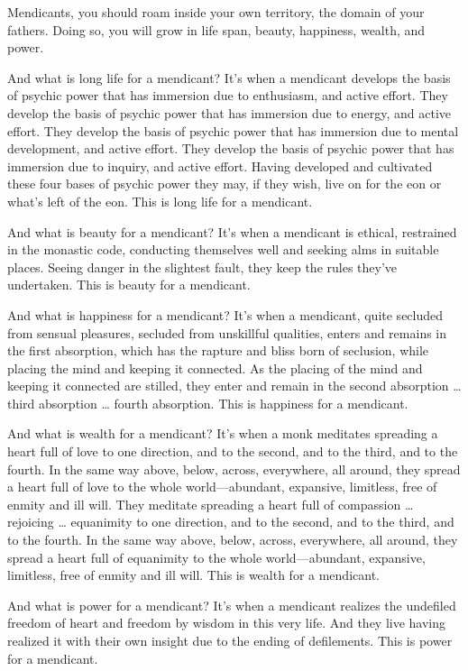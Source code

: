 \documentclass[12pt,openany]{book}%
\begin{document}
Mendicants, you should roam inside your own territory, the domain of your fathers. Doing so, you will grow in life span, beauty, happiness, wealth, and power. 

And what is long life for a mendicant? It’s when a mendicant develops the basis of psychic power that has immersion due to enthusiasm, and active effort. They develop the basis of psychic power that has immersion due to energy, and active effort. They develop the basis of psychic power that has immersion due to mental development, and active effort. They develop the basis of psychic power that has immersion due to inquiry, and active effort. Having developed and cultivated these four bases of psychic power they may, if they wish, live on for the eon or what’s left of the eon. This is long life for a mendicant. 

And what is beauty for a mendicant? It’s when a mendicant is ethical, restrained in the monastic code, conducting themselves well and seeking alms in suitable places. Seeing danger in the slightest fault, they keep the rules they’ve undertaken. This is beauty for a mendicant. 

And what is happiness for a mendicant? It’s when a mendicant, quite secluded from sensual pleasures, secluded from unskillful qualities, enters and remains in the first absorption, which has the rapture and bliss born of seclusion, while placing the mind and keeping it connected. As the placing of the mind and keeping it connected are stilled, they enter and remain in the second absorption … third absorption … fourth absorption. This is happiness for a mendicant. 

And what is wealth for a mendicant? It’s when a monk meditates spreading a heart full of love to one direction, and to the second, and to the third, and to the fourth. In the same way above, below, across, everywhere, all around, they spread a heart full of love to the whole world—abundant, expansive, limitless, free of enmity and ill will. They meditate spreading a heart full of compassion … rejoicing … equanimity to one direction, and to the second, and to the third, and to the fourth. In the same way above, below, across, everywhere, all around, they spread a heart full of equanimity to the whole world—abundant, expansive, limitless, free of enmity and ill will. This is wealth for a mendicant. 

And what is power for a mendicant? It’s when a mendicant realizes the undefiled freedom of heart and freedom by wisdom in this very life. And they live having realized it with their own insight due to the ending of defilements. This is power for a mendicant. 
\end{document}
